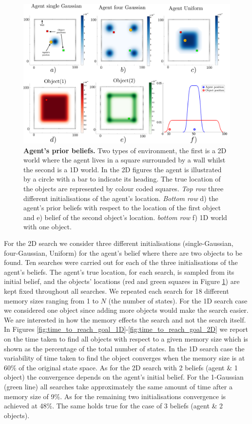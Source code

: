 \begin{figure}
  \includegraphics[width=\textwidth]{./ch5-MLMF/Figures/exploration_initialisation.pdf}
  \caption{\textbf{Agent's prior beliefs.} Two types of environment, the first is 
  a 2D world where the agent lives in a square surrounded by a wall whilst the second is a 1D
  world. In the 2D figures the agent is illustrated by a circle with a bar to indicate its heading. The true location 
  of the objects are represented by colour coded squares. \textit{Top row} three different initialisations of the agent's location. 
  \textit{Bottom row} d) the agent's prior beliefs with respect to the location of the first object and e) belief of the second object's location.
  \textit{bottom row} f) 1D world with one object.}
  \label{fig:exploration_init}
\end{figure}

For the 2D search we consider three different initialisations (single-Gaussian, four-Gaussian, Uniform) for the agent's belief where there are 
two objects to be found. Ten searches were carried out for each of the three initialisations of the agent's beliefs. 
The agent's true location, for each search, is sampled from its initial belief, and the objects' locations 
(red and green squares in Figure \ref{fig:exploration_init}) are kept fixed throughout all searches. We repeated each search for 
18 different memory sizes ranging from 1 to $N$ (the number of states). For the 1D search case we considered one object since adding more objects would 
make the search easier. We are interested in how the memory effects the search and not the search itself. In Figures \ref{fig:time_to_reach_goal_1D}-\ref{fig:time_to_reach_goal_2D} we 
report on the time taken to find all objects with respect to a given memory size which is shown as the percentage of the total number of states. 
In the 1D search case the variability of time taken to find the object converges when the memory size is at 60\% of the original state space. 
As for the 2D search with 2 beliefs (agent \& 1 object) the convergence depends on the agent's initial belief. For the 1-Gaussian (green line) 
all searches take approximately the same amount of time after a memory size of 9\%. As for the remaining two initialisations convergence is achieved at  48\%. 
The same holds true for the case of 3 beliefs (agent \& 2 objects).

